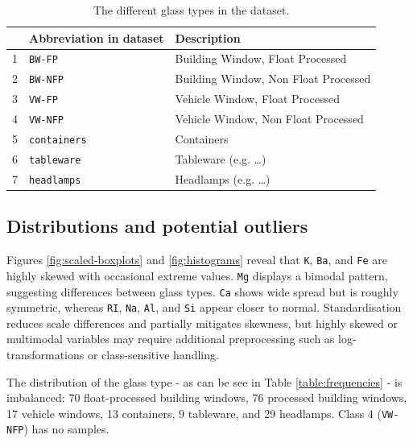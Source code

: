 \documentclass[dtu]{dtuarticle}
\begin{document}
	\begin{table}
		\centering
		\begin{tabular}{r|l|l}
			\textbf{} & \textbf{Abbreviation in dataset} & \textbf{Description}                 \\ \hline\hline
			1 & \texttt{BW-FP}                   & Building Window, Float Processed     \\ \hline
			2 & \texttt{BW-NFP}                  & Building Window, Non Float Processed \\ \hline
			3 & \texttt{VW-FP}                   & Vehicle Window, Float Processed      \\ \hline
			4 & \texttt{VW-NFP}                  & Vehicle Window, Non Float Processed  \\ \hline
			5 & \texttt{containers}              & Containers                           \\ \hline
			6 & \texttt{tableware}               & Tableware (e.g. \dots)               \\ \hline
			7 & \texttt{headlamps}               & Headlamps (e.g. \dots)
		\end{tabular}
		\caption{The different glass types in the dataset.}
		\label{table:types}
	\end{table}

	\subsection{Distributions and potential outliers}

	Figures \ref{fig:scaled-boxplots} and \ref{fig:histograms} reveal that \texttt{K}, \texttt{Ba}, and \texttt{Fe} are highly skewed with occasional extreme values. \texttt{Mg} displays a bimodal pattern, suggesting differences between glass types. \texttt{Ca} shows wide spread but is roughly symmetric, whereas \texttt{RI}, \texttt{Na}, \texttt{Al}, and \texttt{Si} appear closer to normal. Standardisation reduces scale differences and partially mitigates skewness, but highly skewed or multimodal variables may require additional preprocessing such as log-transformations or class-sensitive handling.

	The distribution of the glass type - as can be see in Table \ref{table:frequencies} - is imbalanced: 70 float-processed building windows, 76 processed building windows, 17 vehicle windows, 13 containers, 9 tableware, and 29 headlamps. Class 4 (\texttt{VW-NFP}) has no samples.
\end{document}
